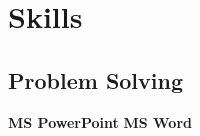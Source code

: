 \documentclass[]{dhirendra-pratap-singh-resume}
\begin{document}
\begin{minipage}[t]{0.33\textwidth}






\section{Skills}
{\subsection{Problem Solving}}
{\textbf{MS PowerPoint} \textbullet{} \textbf{MS Word}}

\end{minipage}
\end{document}
